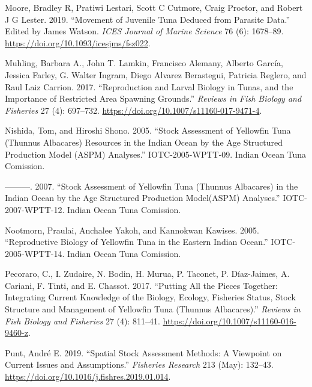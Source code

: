 \documentclass[
]{scrartcl}
\newlength{\cslhangindent}
\newenvironment{CSLReferences}[2] %
 {\begin{list}{}{%
  \setlength{\itemindent}{0pt}
  \setlength{\leftmargin}{0pt}
  \setlength{\parsep}{0pt}
  \ifodd #1
   \setlength{\leftmargin}{\cslhangindent}
   \setlength{\itemindent}{-1\cslhangindent}
  \fi
  \setlength{\itemsep}{#2\baselineskip}}}
 {\end{list}}
\begin{document}
\begin{CSLReferences}{1}{0}
Moore, Bradley R, Pratiwi Lestari, Scott C Cutmore, Craig Proctor, and
Robert J G Lester. 2019. {``Movement of Juvenile Tuna Deduced from
Parasite Data.''} Edited by James Watson. \emph{ICES Journal of Marine
Science} 76 (6): 1678--89. \url{https://doi.org/10.1093/icesjms/fsz022}.

Muhling, Barbara A., John T. Lamkin, Francisco Alemany, Alberto García,
Jessica Farley, G. Walter Ingram, Diego Alvarez Berastegui, Patricia
Reglero, and Raul Laiz Carrion. 2017. {``Reproduction and Larval Biology
in Tunas, and the Importance of Restricted Area Spawning Grounds.''}
\emph{Reviews in Fish Biology and Fisheries} 27 (4): 697--732.
\url{https://doi.org/10.1007/s11160-017-9471-4}.

Nishida, Tom, and Hiroshi Shono. 2005. {``Stock Assessment of Yellowfin
Tuna ({Thunnus} Albacares) Resources in the {Indian Ocean} by the Age
Structured Production Model ({ASPM}) Analyses.''} IOTC-2005-WPTT-09.
Indian Ocean Tuna Comission.

---------. 2007. {``Stock Assessment of Yellowfin Tuna ({Thunnus}
Albacares) in the {Indian Ocean} by the Age Structured Production
Model({ASPM}) Analyses.''} IOTC-2007-WPTT-12. Indian Ocean Tuna
Comission.

Nootmorn, Praulai, Anchalee Yakoh, and Kannokwan Kawises. 2005.
{``Reproductive Biology of Yellowfin Tuna in the Eastern {Indian
Ocean}.''} IOTC-2005-WPTT-14. Indian Ocean Tuna Comission.

Pecoraro, C., I. Zudaire, N. Bodin, H. Murua, P. Taconet, P.
Díaz-Jaimes, A. Cariani, F. Tinti, and E. Chassot. 2017. {``Putting All
the Pieces Together: Integrating Current Knowledge of the Biology,
Ecology, Fisheries Status, Stock Structure and Management of Yellowfin
Tuna ({Thunnus} Albacares).''} \emph{Reviews in Fish Biology and
Fisheries} 27 (4): 811--41.
\url{https://doi.org/10.1007/s11160-016-9460-z}.

Punt, André E. 2019. {``Spatial Stock Assessment Methods: {A} Viewpoint
on Current Issues and Assumptions.''} \emph{Fisheries Research} 213
(May): 132--43. \url{https://doi.org/10.1016/j.fishres.2019.01.014}.


\end{CSLReferences}
\end{document}
